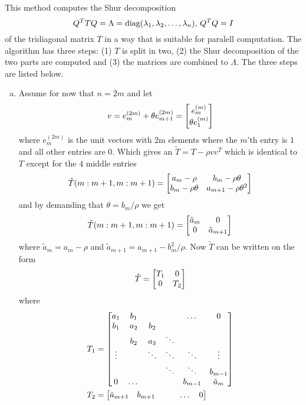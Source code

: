 This method computes the Shur decomposition 
\begin{equation}
	Q^TTQ = \Lambda = \text{diag}{(}\lambda_1,\lambda_2,\dots,\lambda_n),\, Q^TQ = I
\end{equation}
of the tridiagonal matrix $T$ in a way that is suitable for paralell computation.
The algorithm has three steps: (1) $T$ is split in two, (2) the Shur decomposition of the
two parts are computed and (3) the matrices are combined to $\Lambda$.
%
The three steps are listed below.
%
\begin{enumerate}[(a):]
%
%
\item 
Assume for now that $n=2m$ and let
\begin{equation}
	v = e_m^{(2m)} + \theta e_{m+1}^{(2m)} = \left[\begin{matrix} e_m^{(m)} \\ \theta e_{1}^{(m)} \end{matrix}\right]
\end{equation}
where $e_m^{(2m)}$ is the unit vectors with 2m elements where the 
$m$'th entry is $1$ and all other entries are 0.
Which gives an $\tilde T = T - \rho vv^T$ which is identical to $T$ except for the $4$ middle 
entries
\begin{equation}
	\tilde T(m:m+1,m:m+1) = 
	\left[\begin{matrix} 
		a_m-\rho & b_m-\rho\theta\\
		b_m-\rho\theta & a_{m+1} - \rho\theta^2
	 \end{matrix}\right] 
\end{equation}
and by demanding that $\theta = b_m/\rho$ we get
\begin{equation}
	\tilde T(m:m+1,m:m+1) = 
	\left[\begin{matrix} 
		\tilde a_m & 0\\
		0 & \tilde a_{m+1}
	 \end{matrix}\right] 
\end{equation}
where $\tilde a_m = a_m-\rho$ and $\tilde a_{m+1} = a_{m+1}-b_m^2/\rho$.
Now $\tilde T$ can be written on the form
\begin{equation}
	\tilde T = 
	\left[\begin{matrix} 
		T_1 & 0\\
		0 & T_2
	 \end{matrix}\right] 
\end{equation}
where
\begin{align}
T_1&=
	\smatrix{
		a_1 & b_1 & 	&  		& \dots & 0\\
		b_1 & a_2 & b_2 & 		&  		& \\
		   & b_2 & a_3 & \ddots   & 		& \\
		\vdots 	&  &\ddots  & \ddots	& \ddots	& \vdots\\
			& 	  & 	& \ddots		& \ddots		& b_{m-1} \\
		0	& \dots	  & 	& 		& b_{m-1}& \tilde a_m 
	}\\
%
T_2&=
	\smatrix{
		\tilde a_{m+1} & b_{m+1} & 	&  		& \dots & 0\\
}
\end{align}
\end{enumerate}
